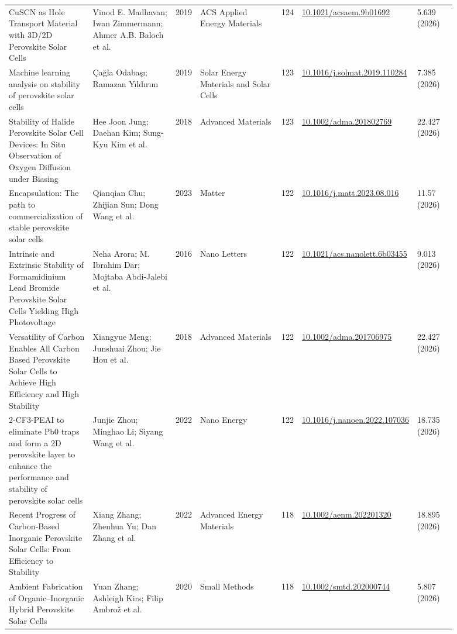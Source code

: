 \documentclass[10pt,a4paper]{article}
\begin{document}
{\begin{longtable}{p{0.197\linewidth}p{0.197\linewidth}p{0.043\linewidth}p{0.197\linewidth}p{0.043\linewidth}p{0.117\linewidth}p{0.098\linewidth}}
CuSCN as Hole Transport Material with 3D/2D Perovskite Solar Cells & Vinod E. Madhavan; Iwan Zimmermann; Ahmer A.B. Baloch et al. & 2019 & ACS Applied Energy Materials & 124 & \href{https://doi.org/10.1021/acsaem.9b01692}{10.1021/acsaem.9b01692} & 5.639 (2026) \\
Machine learning analysis on stability of perovskite solar cells & Çağla Odabaşı; Ramazan Yıldırım & 2019 & Solar Energy Materials and Solar Cells & 123 & \href{https://doi.org/10.1016/j.solmat.2019.110284}{10.1016/j.solmat.2019.110284} & 7.385 (2026) \\
Stability of Halide Perovskite Solar Cell Devices: In Situ Observation of Oxygen Diffusion under Biasing & Hee Joon Jung; Daehan Kim; Sung-Kyu Kim et al. & 2018 & Advanced Materials & 123 & \href{https://doi.org/10.1002/adma.201802769}{10.1002/adma.201802769} & 22.427 (2026) \\
Encapsulation: The path to commercialization of stable perovskite solar cells & Qianqian Chu; Zhijian Sun; Dong Wang et al. & 2023 & Matter & 122 & \href{https://doi.org/10.1016/j.matt.2023.08.016}{10.1016/j.matt.2023.08.016} & 11.57 (2026) \\
Intrinsic and Extrinsic Stability of Formamidinium Lead Bromide Perovskite Solar Cells Yielding High Photovoltage & Neha Arora; M. Ibrahim Dar; Mojtaba Abdi‐Jalebi et al. & 2016 & Nano Letters & 122 & \href{https://doi.org/10.1021/acs.nanolett.6b03455}{10.1021/acs.nanolett.6b03455} & 9.013 (2026) \\
Versatility of Carbon Enables All Carbon Based Perovskite Solar Cells to Achieve High Efficiency and High Stability & Xiangyue Meng; Junshuai Zhou; Jie Hou et al. & 2018 & Advanced Materials & 122 & \href{https://doi.org/10.1002/adma.201706975}{10.1002/adma.201706975} & 22.427 (2026) \\
2-CF3-PEAI to eliminate Pb0 traps and form a 2D perovskite layer to enhance the performance and stability of perovskite solar cells & Junjie Zhou; Minghao Li; Siyang Wang et al. & 2022 & Nano Energy & 122 & \href{https://doi.org/10.1016/j.nanoen.2022.107036}{10.1016/j.nanoen.2022.107036} & 18.735 (2026) \\
Recent Progress of Carbon‐Based Inorganic Perovskite Solar Cells: From Efficiency to Stability & Xiang Zhang; Zhenhua Yu; Dan Zhang et al. & 2022 & Advanced Energy Materials & 118 & \href{https://doi.org/10.1002/aenm.202201320}{10.1002/aenm.202201320} & 18.895 (2026) \\
Ambient Fabrication of Organic–Inorganic Hybrid Perovskite Solar Cells & Yuan Zhang; Ashleigh Kirs; Filip Ambrož et al. & 2020 & Small Methods & 118 & \href{https://doi.org/10.1002/smtd.202000744}{10.1002/smtd.202000744} & 5.807 (2026) \\

\end{longtable}}
\end{document}

